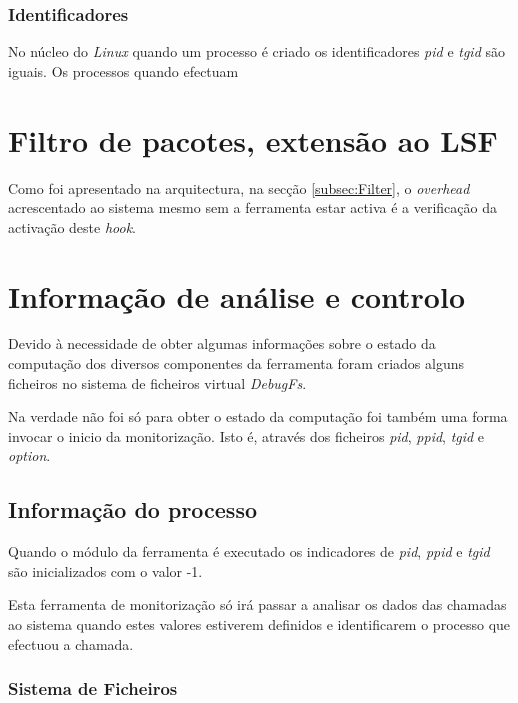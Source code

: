 \subsubsection{Identificadores}

No núcleo do \textit{Linux} quando um processo é criado os identificadores \textit{pid} e \textit{tgid} são iguais.
Os processos quando efectuam



\section{Filtro de pacotes, extensão ao LSF}

Como foi apresentado na arquitectura, na secção \ref{subsec:Filter}, o \textit{overhead} acrescentado ao sistema mesmo sem a ferramenta estar activa é
a verificação da activação deste \textit{hook}.

\section{Informação de análise e controlo}

Devido à necessidade de obter algumas informações sobre o estado da computação dos diversos componentes da ferramenta foram criados alguns ficheiros no
sistema de ficheiros virtual \textit{DebugFs}.

Na verdade não foi só para obter o estado da computação foi também uma forma invocar o inicio da monitorização.
 Isto é, através dos ficheiros \textit{pid}, \textit{ppid}, \textit{tgid} e \textit{option}. 

\subsection{Informação do processo}

Quando o módulo da ferramenta é executado os indicadores de \textit{pid}, \textit{ppid} e \textit{tgid} são inicializados com o valor -1.

Esta ferramenta de monitorização só irá passar a analisar os dados das chamadas ao sistema quando estes valores estiverem definidos e identificarem o processo que efectuou a chamada.

\subsubsection{Sistema de Ficheiros}

